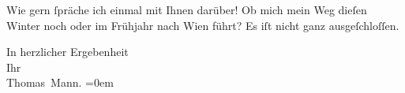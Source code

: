 \pstart
           Wie gern{ }ſpräche ich einmal mit Ihnen darüber! Ob mich mein Weg dieſen Winter noch
               oder im Frühjahr nach Wien führt? Es iſt nicht
               ganz ausgeſchloſſen.\pend
           
\pstart
           In herzlicher Ergebenheit{\\[\baselineskip]}Ihr{\\[\baselineskip]}\spacefill\mbox{Thomas Mann.}\pend
           \leftskip=0em{}\endnumbering{}  \newcommand{\dateiname}{L02430}\newcommand{\titel}{Thomas Mann an Arthur Schnitzler, 9. 1. 1925}\newcommand{\editorInnen}{Martin Anton Müller und Gerd-Hermann Susen}
